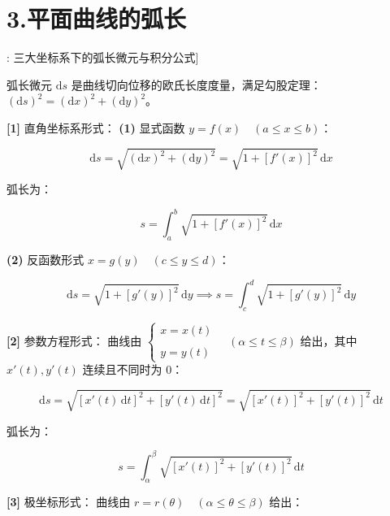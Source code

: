 \documentclass[11pt,a4paper,UTF8]{ctexart}
\begin{document}
\section{3.平面曲线的弧长}

\begin{thmbox}[公式[6]: 三大坐标系下的弧长微元与积分公式]

弧长微元 $\mathrm{d}s$ 是曲线切向位移的欧氏长度度量，满足勾股定理：$(\mathrm{d}s)^2 = (\mathrm{d}x)^2 + (\mathrm{d}y)^2$。

\textbf{[1]} 直角坐标系形式：
\textbf{(1)}  \textit{}显式函数 $y = f(x) \quad (a \leqslant x \leqslant b)$\textit{}：


\begin{equation*}
\mathrm{d}s = \sqrt{(\mathrm{d}x)^2 + (\mathrm{d}y)^2} = \sqrt{1 + [f'(x)]^2}\,\mathrm{d}x
\end{equation*}


弧长为：


\begin{equation*}
s = \int_a^b \sqrt{1 + [f'(x)]^2}\,\mathrm{d}x
\end{equation*}


\textbf{(2)}  \textit{}反函数形式 $x = g(y) \quad (c \leqslant y \leqslant d)$\textit{}：


\begin{equation*}
\mathrm{d}s = \sqrt{1 + [g'(y)]^2}\,\mathrm{d}y \implies s = \int_c^d \sqrt{1 + [g'(y)]^2}\,\mathrm{d}y
\end{equation*}


\textbf{[2]} 参数方程形式：
曲线由 $\begin{cases} x = x(t) \\ \\ y = y(t) \end{cases} \quad (\alpha \leqslant t \leqslant \beta)$ 给出，其中 $x'(t), y'(t)$ 连续且不同时为 0：


\begin{equation*}
\mathrm{d}s = \sqrt{[x'(t)\,\mathrm{d}t]^2 + [y'(t)\,\mathrm{d}t]^2} = \sqrt{[x'(t)]^2 + [y'(t)]^2}\,\mathrm{d}t
\end{equation*}


弧长为：


\begin{equation*}
s = \int_\alpha^\beta \sqrt{[x'(t)]^2 + [y'(t)]^2}\,\mathrm{d}t
\end{equation*}


\textbf{[3]} 极坐标形式：
曲线由 $r = r(\theta) \quad (\alpha \leqslant \theta \leqslant \beta)$ 给出：


\end{thmbox}
\end{document}
